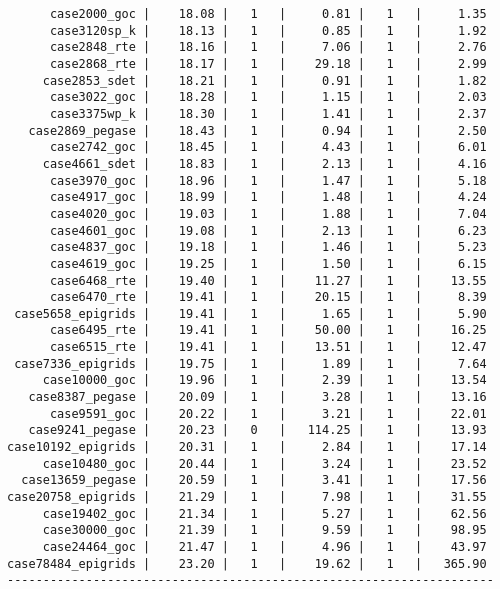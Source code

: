 \begin{lstlisting}
      case2000_goc |    18.08 |   1   |     0.81 |   1   |     1.35
      case3120sp_k |    18.13 |   1   |     0.85 |   1   |     1.92
      case2848_rte |    18.16 |   1   |     7.06 |   1   |     2.76
      case2868_rte |    18.17 |   1   |    29.18 |   1   |     2.99
     case2853_sdet |    18.21 |   1   |     0.91 |   1   |     1.82
      case3022_goc |    18.28 |   1   |     1.15 |   1   |     2.03
      case3375wp_k |    18.30 |   1   |     1.41 |   1   |     2.37
   case2869_pegase |    18.43 |   1   |     0.94 |   1   |     2.50
      case2742_goc |    18.45 |   1   |     4.43 |   1   |     6.01
     case4661_sdet |    18.83 |   1   |     2.13 |   1   |     4.16
      case3970_goc |    18.96 |   1   |     1.47 |   1   |     5.18
      case4917_goc |    18.99 |   1   |     1.48 |   1   |     4.24
      case4020_goc |    19.03 |   1   |     1.88 |   1   |     7.04
      case4601_goc |    19.08 |   1   |     2.13 |   1   |     6.23
      case4837_goc |    19.18 |   1   |     1.46 |   1   |     5.23
      case4619_goc |    19.25 |   1   |     1.50 |   1   |     6.15
      case6468_rte |    19.40 |   1   |    11.27 |   1   |    13.55
      case6470_rte |    19.41 |   1   |    20.15 |   1   |     8.39
 case5658_epigrids |    19.41 |   1   |     1.65 |   1   |     5.90
      case6495_rte |    19.41 |   1   |    50.00 |   1   |    16.25
      case6515_rte |    19.41 |   1   |    13.51 |   1   |    12.47
 case7336_epigrids |    19.75 |   1   |     1.89 |   1   |     7.64
     case10000_goc |    19.96 |   1   |     2.39 |   1   |    13.54
   case8387_pegase |    20.09 |   1   |     3.28 |   1   |    13.16
      case9591_goc |    20.22 |   1   |     3.21 |   1   |    22.01
   case9241_pegase |    20.23 |   0   |   114.25 |   1   |    13.93
case10192_epigrids |    20.31 |   1   |     2.84 |   1   |    17.14
     case10480_goc |    20.44 |   1   |     3.24 |   1   |    23.52
  case13659_pegase |    20.59 |   1   |     3.41 |   1   |    17.56
case20758_epigrids |    21.29 |   1   |     7.98 |   1   |    31.55
     case19402_goc |    21.34 |   1   |     5.27 |   1   |    62.56
     case30000_goc |    21.39 |   1   |     9.59 |   1   |    98.95
     case24464_goc |    21.47 |   1   |     4.96 |   1   |    43.97
case78484_epigrids |    23.20 |   1   |    19.62 |   1   |   365.90
--------------------------------------------------------------------
\end{lstlisting}
    